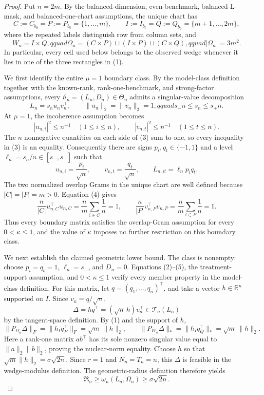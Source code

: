 \documentclass{article}
\begin{document}
\begin{proof}
Put \(n=2m\).  By the balanced-dimension, even-benchmark, balanced-L-mask, and balanced-one-chart assumptions, the unique chart has
\[
C:=C_{b_0}=P:=P_{b_0}=\{1,\ldots,m\},\qquad
I:=I_{b_0}=Q:=Q_{b_0}=\{m+1,\ldots,2m\},
\]
where the repeated labels distinguish row from column sets, and
\[
W_n=I\times Q,qquad
\Omega_n=(C\times P)\mathbin{\sqcup}(I\times P)
\mathbin{\sqcup}(C\times Q),qquad |\Omega_n|=3m^2.       \tag{1}
\]
In particular, every cell used below belongs to the observed wedge whenever it lies in one of the three rectangles in (1).

We first identify the entire \(\mu=1\) boundary class.  By the model-class definition together with the known-rank, rank-one-benchmark, and strong-factor assumptions, every \(\vartheta_n=(L_n,D_n)\in\Theta_n\) admits a singular-value decomposition
\[
L_n=s_nu_nv_n^{\top},\qquad
\lVert u_n\rVert_2=\lVert v_n\rVert_2=1,qquad
s_-n\le s_n\le s_+n.                                    \tag{2}
\]
At \(\mu=1\), the incoherence assumption becomes
\[
|u_{n,i}|^2\le n^{-1}\quad(1\le i\le n),
\qquad |v_{n,t}|^2\le n^{-1}\quad(1\le t\le n).        \tag{3}
\]
The \(n\) nonnegative quantities on each side of (3) sum to one, so every inequality in (3) is an equality.  Consequently there are signs \(p_i,q_t\in\{-1,1\}\) and a level \(\ell_n=s_n/n\in[s_-,s_+]\) such that
\[
u_{n,i}=\frac{p_i}{\sqrt n},\qquad
v_{n,t}=\frac{q_t}{\sqrt n},\qquad
L_{n,it}=\ell_np_iq_t.                                  \tag{4}
\]
The two normalized overlap Grams in the unique chart are well defined because \(|C|=|P|=m>0\).  Equation (4) gives
\[
\frac{n}{|C|}u_{n,C}^{\top}u_{n,C}
=\frac{n}{m}\sum_{i\in C}\frac1n=1,
\qquad
\frac{n}{|P|}v_{n,P}^{\top}v_{n,P}
=\frac{n}{m}\sum_{t\in P}\frac1n=1.                  \tag{5}
\]
Thus every boundary matrix satisfies the overlap-Gram assumption for every \(0<\kappa\le1\), and the value of \(\kappa\) imposes no further restriction on this boundary class.

We next establish the claimed geometric lower bound.  The class is nonempty: choose \(p_i=q_t=1\), \(\ell_n=s_-\), and \(D_n=0\).  Equations (2)--(5), the treatment-support assumption, and \(0<\kappa\le1\) verify every member property in the model-class definition.  For this matrix, let \(q=(q_1,\ldots,q_n)^{\top}\), and take a vector \(h\in\mathbb R^n\) supported on \(I\).  Since \(v_n=q/\sqrt n\),
\[
\Delta=hq^{\top}=(\sqrt n\,h)v_n^{\top}\in\mathcal T_n(L_n)       \tag{6}
\]
by the tangent-space definition.  By (1) and the support of \(h\),
\[
\lVert P_{\Omega_n}\Delta\rVert_F
=\lVert h_Iq_P^{\top}\rVert_F
=\sqrt m\,\lVert h\rVert_2,
\qquad
\lVert P_{W_n}\Delta\rVert_*
=\lVert h_Iq_Q^{\top}\rVert_*
=\sqrt m\,\lVert h\rVert_2.                            \tag{7}
\]
Here a rank-one matrix \(ab^{\top}\) has its sole nonzero singular value equal to \(\lVert a\rVert_2\lVert b\rVert_2\), proving the nuclear-norm equality.  Choose \(h\) so that \(\sqrt m\lVert h\rVert_2=\sigma\sqrt{2n}\).  Since \(r=1\) and \(N_n=T_n=n\), this \(\Delta\) is feasible in the wedge-modulus definition.  The geometric-radius definition therefore yields
\[
\mathfrak R_n\ge \omega_n(L_n,\Omega_n)
\ge\sigma\sqrt{2n}.                                    \tag{8}
\]


\end{proof}
\end{document}
